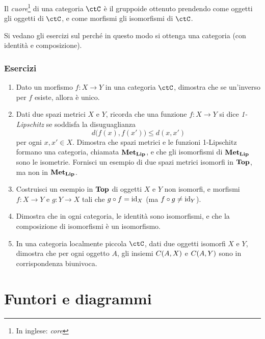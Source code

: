 \begin{definition}
 Il \emph{cuore}\footnote{In inglese: \emph{core}} di una categoria $\ctC$ è il gruppoide ottenuto prendendo come oggetti gli oggetti di $\ctC$, e come morfismi gli isomorfismi di $\ctC$.
\end{definition}

Si vedano gli esercizi sul perché in questo modo si ottenga una categoria (con identità e composizione).


\subsubsection*{Esercizi}
\begin{enumerate}
    \item Dato un morfismo $f:X\to Y$ in una categoria $\ctC$, dimostra che se un'inverso per $f$ esiste, allora è unico.
    \item Dati due spazi metrici $X$ e $Y$, ricorda che una funzione $f:X\to Y$ si dice \emph{1-Lipschitz} se soddisfa la disuguaglianza
    \[
     d\big( f(x), f(x') \big) \le d(x,x')
    \]
    per ogni $x,x'\in X$. Dimostra che spazi metrici e le funzioni 1-Lipschitz formano una categoria, chiamata $\mathbf{Met}_{\mathbf{Lip}}$, e che gli isomorfismi di $\mathbf{Met}_{\mathbf{Lip}}$ sono le isometrie. Fornisci un esempio di due spazi metrici isomorfi in $\mathbf{Top}$, ma non in $\mathbf{Met}_{\mathbf{Lip}}$.
    \item Costruisci un esempio in $\mathbf{Top}$ di oggetti $X$ e $Y$ non isomorfi, e morfismi $f:X\to Y$ e $g:Y\to X$ tali che $g\circ f=\mathrm{id}_X$ (ma $f\circ g \ne \mathrm{id}_Y$).
    \item Dimostra che in ogni categoria, le identità sono isomorfismi, e che la composizione di isomorfismi è un isomorfismo.
    \item In una categoria localmente piccola $\ctC$, dati due oggetti isomorfi $X$ e $Y$, dimostra che per ogni oggetto $A$, gli insiemi $C(A,X)$ e $C(A,Y)$ sono in corrispondenza biunivoca.
\end{enumerate}


\section{Funtori e diagrammi}


